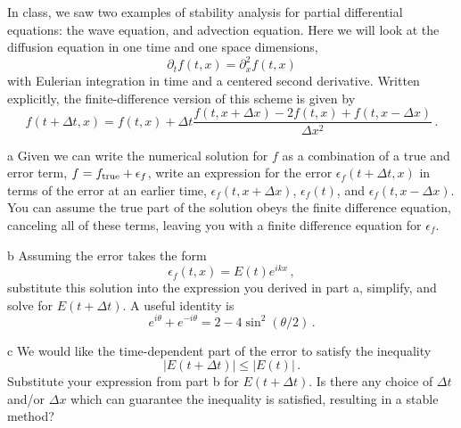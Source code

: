 \documentclass[]{homework}
\begin{document}

\begin{problem}{1}
  In class, we saw two examples of stability analysis for partial
  differential equations: the wave equation, and advection equation.
  Here we will look at the diffusion equation in one time and one
  space dimensions,
  \[
    \partial_t f(t, x) = \partial_x^2 f(t, x)
  \]
  with Eulerian integration
  in time and a centered second derivative. Written explicitly, the
  finite-difference version of this scheme is given by
  \[
    f(t+\Delta t, x) = f(t, x) + \Delta t \frac{f(t, x+\Delta x) - 2 f(t, x) + f(t, x-\Delta x)}{\Delta x^2}\,.
  \]

  \begin{subproblem}{a}
    Given we can write the numerical solution for $f$ as a combination of
    a true and error term, $f = f_{\rm true} + \epsilon_f$, write an
    expression for the error $\epsilon_f(t+\Delta t, x)$ in terms of
    the error at an earlier time, $\epsilon_f(t, x+\Delta x)$, 
    $\epsilon_f(t)$, and $\epsilon_f(t, x-\Delta x)$. You can assume the
    true part of the solution obeys the finite difference equation,
    canceling all of these terms, leaving you with a finite difference
    equation for $\epsilon_f$.
  \end{subproblem}

  \begin{subproblem}{b}
    Assuming the error takes the form
    \[
      \epsilon_f(t, x) = E(t)e^{ikx}\,,
    \]
    substitute this solution into the expression you derived in
    part a, simplify, and solve for $E(t+\Delta t)$.
    A useful identity is
    \[
      e^{i\theta} + e^{-i\theta} = 2 - 4\sin^2(\theta/2)\,.
    \]
  \end{subproblem}

  \begin{subproblem}{c}
    We would like the time-dependent part of the error 
    to satisfy the inequality
    \[
      |E(t+\Delta t)| \le |E(t)|\,.
    \]
    Substitute your expression from part b for $E(t+\Delta t)$.
    Is there any choice of $\Delta t$ and/or $\Delta x$ which
    can guarantee the inequality is satisfied, resulting in a
    stable method?
  \end{subproblem}

\end{problem}
\end{document}
